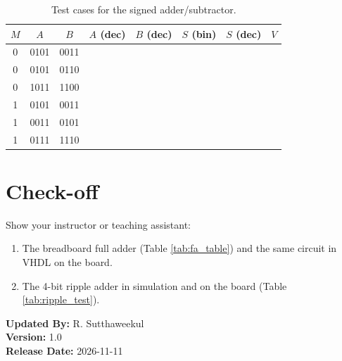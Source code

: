 \documentclass{article}
\begin{document}
\begin{table}[H]
    \centering
    \begin{tabular}{|c|c|c|c|c|c|c|c|}
        \hline
        $M$ & $A$ & $B$ & $A$ (dec) & $B$ (dec) & $S$ (bin) & $S$ (dec) & $V$ \\
        \hline
        0 & 0101 & 0011 & & & & & \\
        0 & 0101 & 0110 & & & & & \\
        0 & 1011 & 1100 & & & & & \\
        1 & 0101 & 0011 & & & & & \\
        1 & 0011 & 0101 & & & & & \\
        1 & 0111 & 1110 & & & & & \\
        \hline
    \end{tabular}
    \caption{Test cases for the signed adder/subtractor.}
    \label{tab:addsub}
\end{table}

\section*{Check-off}
Show your instructor or teaching assistant:
\begin{enumerate}
    \item The breadboard full adder (Table \ref{tab:fa_table}) and the same circuit in VHDL on the board.
    \item The 4-bit ripple adder in simulation and on the board (Table \ref{tab:ripple_test}).
\end{enumerate}

\vspace{1cm}
\noindent \textbf{Updated By:} R. Sutthaweekul \\
\textbf{Version:} 1.0 \\
\textbf{Release Date:} 2026-11-11
\end{document}
